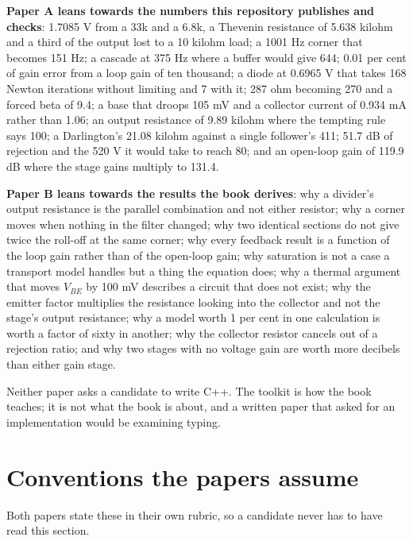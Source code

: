 \textbf{Paper A leans towards the numbers this repository publishes and checks}: 1.7085 V from a 33k and a 6.8k, a Thevenin resistance of 5.638 kilohm and a third of the output lost to a 10 kilohm load; a 1001 Hz corner that becomes 151 Hz; a cascade at 375 Hz where a buffer would give 644; 0.01 per cent of gain error from a loop gain of ten thousand; a diode at 0.6965 V that takes 168 Newton iterations without limiting and 7 with it; 287 ohm becoming 270 and a forced beta of 9.4; a base that droops 105 mV and a collector current of 0.934 mA rather than 1.06; an output resistance of 9.89 kilohm where the tempting rule says 100; a Darlington's 21.08 kilohm against a single follower's 411; 51.7 dB of rejection and the 520 V it would take to reach 80; and an open-loop gain of 119.9 dB where the stage gains multiply to 131.4.

\textbf{Paper B leans towards the results the book derives}: why a divider's output resistance is the parallel combination and not either resistor; why a corner moves when nothing in the filter changed; why two identical sections do not give twice the roll-off at the same corner; why every feedback result is a function of the loop gain rather than of the open-loop gain; why saturation is not a case a transport model handles but a thing the equation does; why a thermal argument that moves $V_{BE}$ by 100 mV describes a circuit that does not exist; why the emitter factor multiplies the resistance looking into the collector and not the stage's output resistance; why a model worth 1 per cent in one calculation is worth a factor of sixty in another; why the collector resistor cancels out of a rejection ratio; and why two stages with no voltage gain are worth more decibels than either gain stage.

Neither paper asks a candidate to write C++. The toolkit is how the book teaches; it is not what the book is about, and a written paper that asked for an  implementation would be examining typing.

\section*{Conventions the papers assume}

Both papers state these in their own rubric, so a candidate never has to have read this section.

